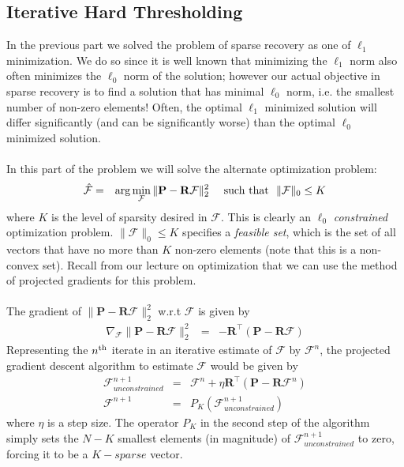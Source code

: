 \subsection{Iterative Hard Thresholding}
In the previous part we solved the problem of sparse recovery as one of $\ell_1$ minimization.  We do so since it is well known that minimizing the $\ell_1$ norm also often minimizes the $\ell_0$ norm of the solution; however our actual objective in sparse recovery is to find a solution that has minimal $\ell_0$ norm, i.e. the smallest number of non-zero elements! Often, the optimal $\ell_1$ minimized solution will differ significantly (and can be significantly worse) than the optimal $\ell_0$ minimized solution.
\\
\\
In this part of the problem we will solve the alternate optimization problem:
\begin{eqnarray}
\hat{\mathcal{F}} & = & \arg\min_{\mathcal{F}} \|\mathbf{P} - \mathbf{R}\mathcal{F}\|_2^2~~~~{\rm such~that}~~\|\mathcal{F}\|_0 \leq K
\end{eqnarray}
where $K$ is the level of sparsity desired in $\mathcal{F}$. This is clearly an $\ell_0$ \textit{constrained} optimization problem. $\|\mathcal{F}\|_0 \leq K$ specifies a \textit{feasible set}, which is the set of all vectors that have no more than $K$ non-zero elements (note that this is a non-convex set). Recall from our lecture on optimization that we can use the method of projected gradients for this problem.
\\
\\
The gradient of $ \|\mathbf{P} - \mathbf{R}\mathcal{F}\|_2^2$ w.r.t $\mathcal{F}$ is given by
\begin{eqnarray}
\nabla_{\mathcal{F}}  \|\mathbf{P} - \mathbf{R}\mathcal{F}\|_2^2 & = & -\mathbf{R}^\top (\mathbf{P} - \mathbf{R}\mathcal{F})
\end{eqnarray}
Representing the $n^{\rm th}$ iterate in an iterative estimate of $\mathcal{F}$ by $\mathcal{F}^n$,  the projected gradient descent algorithm to estimate $\mathcal{F}$ would be given by
\begin{eqnarray}
\mathcal{F}_{unconstrained}^{n+1} & = & \mathcal{F}^n + \eta \mathbf{R}^\top (\mathbf{P} - \mathbf{R}\mathcal{F}^n) \\
\mathcal{F}^{n+1} &= & P_K(\mathcal{F}_{unconstrained}^{n+1})
\end{eqnarray}
where $\eta$ is a step size. The operator $P_K$ in the second step of the algorithm simply sets the $N-K$ smallest elements (in magnitude) of $\mathcal{F}_{unconstrained}^{n+1}$ to zero, forcing it to be a $K-sparse$ vector.
